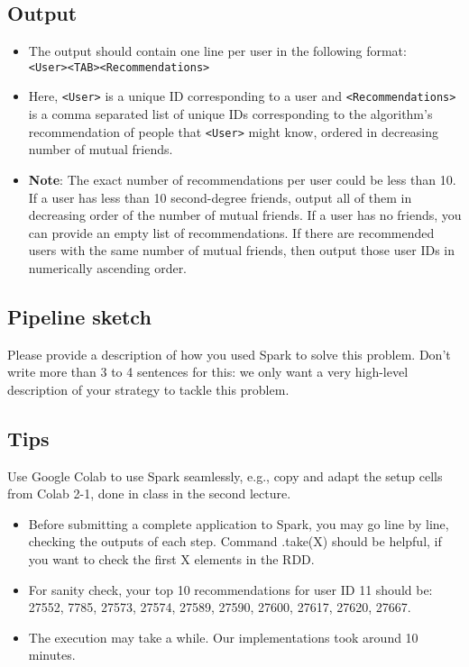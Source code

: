 \documentclass[paper=a4, fontsize=11pt]{scrartcl} %
\begin{document}
\subsection{Output}
\begin{itemize}
    \item The output should contain one line per user in the following format: \\ \verb"<User><TAB><Recommendations>"
    \item Here, \verb"<User>" is a unique ID corresponding to a user and \verb"<Recommendations>" is a comma separated list of unique IDs corresponding to the algorithm’s recommendation of people that \verb"<User>" might know, ordered in decreasing number of mutual friends. 
    \item \textbf{Note}: The exact number of recommendations per user could be less than 10. If a user has less than 10 second-degree friends, output all of them in decreasing order of the number of mutual friends. If a user has no friends, you can provide an empty list of recommendations. If there are recommended users with the same number of mutual friends, then output those user IDs in numerically ascending order.
\end{itemize}

\subsection{Pipeline sketch}
Please provide a description of how you used Spark to solve this problem. Don’t write more than 3 to 4 sentences for this: we only want a very high-level description of your strategy to tackle this problem. 

\subsection{Tips}
 Use Google Colab to use Spark seamlessly, e.g., copy and adapt the setup cells from Colab 2-1, done in class in the second lecture. 
 
\begin{itemize}
    \item Before submitting a complete application to Spark, you may go line by line, checking the outputs of each step. Command .take(X) should be helpful, if you want to check the first X elements in the RDD. 
    \item For sanity check, your top 10 recommendations for user ID 11 should be: \\ 27552, 7785, 27573, 27574, 27589, 27590, 27600, 27617, 27620, 27667. 
    \item The execution may take a while. Our implementations took around 10 minutes. 
\end{itemize}
\end{document}
